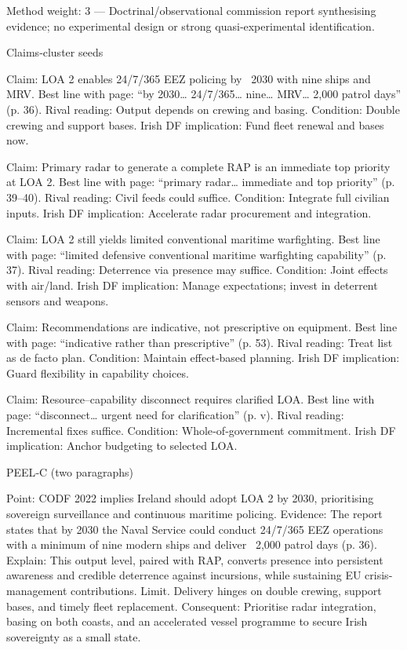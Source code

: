 Method weight: 3 — Doctrinal/observational commission report synthesising evidence; no experimental design or strong quasi‐experimental identification.

Claims‐cluster seeds

Claim: LOA 2 enables 24/7/365 EEZ policing by ~2030 with nine ships and MRV. Best line with page: “by 2030… 24/7/365… nine… MRV… 2,000 patrol days” (p. 36). Rival reading: Output depends on crewing and basing. Condition: Double crewing and support bases. Irish DF implication: Fund fleet renewal and bases now.

Claim: Primary radar to generate a complete RAP is an immediate top priority at LOA 2. Best line with page: “primary radar… immediate and top priority” (p. 39–40). Rival reading: Civil feeds could suffice. Condition: Integrate full civilian inputs. Irish DF implication: Accelerate radar procurement and integration.

Claim: LOA 2 still yields limited conventional maritime warfighting. Best line with page: “limited defensive conventional maritime warfighting capability” (p. 37). Rival reading: Deterrence via presence may suffice. Condition: Joint effects with air/land. Irish DF implication: Manage expectations; invest in deterrent sensors and weapons.

Claim: Recommendations are indicative, not prescriptive on equipment. Best line with page: “indicative rather than prescriptive” (p. 53). Rival reading: Treat list as de facto plan. Condition: Maintain effect‐based planning. Irish DF implication: Guard flexibility in capability choices.

Claim: Resource–capability disconnect requires clarified LOA. Best line with page: “disconnect… urgent need for clarification” (p. v). Rival reading: Incremental fixes suffice. Condition: Whole‐of‐government commitment. Irish DF implication: Anchor budgeting to selected LOA.

PEEL‐C (two paragraphs)

Point: CODF 2022 implies Ireland should adopt LOA 2 by 2030, prioritising sovereign surveillance and continuous maritime policing.
Evidence: The report states that by 2030 the Naval Service could conduct 24/7/365 EEZ operations with a minimum of nine modern ships and deliver ~2,000 patrol days (p. 36).
Explain: This output level, paired with RAP, converts presence into persistent awareness and credible deterrence against incursions, while sustaining EU crisis‐management contributions.
Limit. Delivery hinges on double crewing, support bases, and timely fleet replacement.
Consequent: Prioritise radar integration, basing on both coasts, and an accelerated vessel programme to secure Irish sovereignty as a small state.

